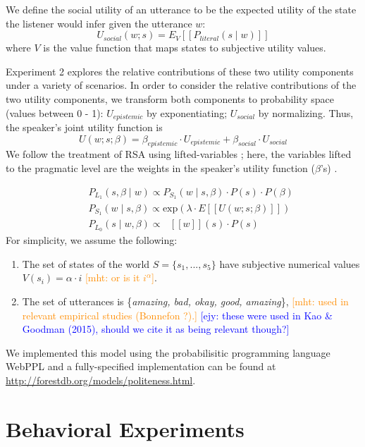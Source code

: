 \documentclass[10pt,letterpaper]{article}
\newcommand{\denote}[1]{\mbox{ $[\![ #1 ]\!]$}}
\newcommand{\mht}[1]{\textcolor{DarkOrange}{[mht: #1]}}
\newcommand{\ejy}[1]{\textcolor{Blue}{[ejy: #1]}}
\begin{document}
We define the social utility of an utterance to be the expected utility of the state the listener would infer given the utterance $w$: 
%
$$
U_{social}(w; s) = E_{V}[[P_{literal}(s \mid w)]]
$$
%
where $V$ is the value function that maps states to subjective utility values. 

Experiment 2 explores the relative contributions of these two utility components under a variety of scenarios. 
In order to consider the relative contributions of the two utility components, we transform both components to probability space (values between 0 - 1): $U_{epistemic}$ by exponentiating; $U_{social}$ by normalizing. Thus, the speaker's joint utility function is
%
$$
U(w;s; \beta) = \beta_{epistemic}\cdot U_{epistemic} + \beta_{social} \cdot U_{social}
$$
%
We follow the treatment of RSA using lifted-variables \cite{GoodmanLassiter2015, Kao2014, Degen2015}; here, the variables lifted to the pragmatic level are the weights in the speaker's utility function ($\beta$'s) .

%
\begin{eqnarray}
&&P_{L_1}(s, \beta \mid w)\propto P_{S_1}(w \mid s, \beta)\cdot P(s) \cdot P(\beta) \label{eq:L1}\\
&&P_{S_1}(w \mid s, \beta) \propto \mathrm{exp}(\lambda \cdot E[[U(w; s; \beta)]])\label{eq:S1}\\
&&P_{L_0}(s \mid w, \beta)\propto \denote{w}(s) \cdot P(s) \label{eq:L0}
\end{eqnarray}
%
For simplicity, we assume the following:
\begin{enumerate}
\item The set of states of the world $S = \{s_{1}, ...,  s_{5}\}$ have subjective numerical values $V(s_{i}) = \alpha \cdot i$ \mht{or is it $i^\alpha$}. 
\item The set of utterances is \{\emph{amazing, bad, okay, good, amazing}\},
  \mht{used in relevant empirical studies (Bonnefon ?).}
   \ejy{these were used in Kao \& Goodman (2015), should we cite it as being relevant though?}
\end{enumerate}

We implemented this model using the probabilisitic programming language WebPPL \cite{dippl} and a fully-specified implementation can be found at \url{http://forestdb.org/models/politeness.html}.


\section{Behavioral Experiments}
\end{document}
